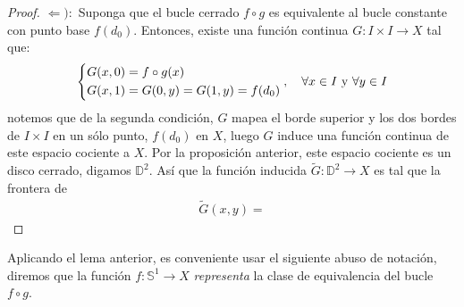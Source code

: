 \documentclass[12pt]{report}
\theoremstyle{largebreak}
\newcommand\cf[3]{\ensuremath{#1:#2\rightarrow#3}}
\begin{document}
\begin{proof}
        $\Leftarrow):$ Suponga que el bucle cerrado $f\circ g$ es equivalente al bucle constante con punto base $f(d_0)$. Entonces, existe una función continua $\cf{G}{I\times I}{X}$ tal que:
        \begin{equation*}
            \left\{
                \begin{split}
                    G(x,0) & = f\circ g(x)\\
                    G(x,1) & = G(0,y) = G(1,y) = f(d_0)\\
                \end{split}
            \right.,\quad\forall x\in I\textup{ y }\forall y\in I
        \end{equation*}
        notemos que de la segunda condición, $G$ mapea el borde superior y los dos bordes de $I\times I$ en un sólo punto, $f(d_0)$ en $X$, luego $G$ induce una función continua de este espacio cociente a $X$. Por la proposición anterior, este espacio cociente es un disco cerrado, digamos $\mathbb{D}^2$. Así que la función inducida $\cf{\widetilde{G}}{\mathbb{D}^2}{X}$ es tal que la frontera de %
        \begin{equation*}
            \begin{split}
                \widetilde{G}(x,y)=
            \end{split}
        \end{equation*}
    \end{proof}

    Aplicando el lema anterior, es conveniente usar el siguiente abuso de notación, diremos que la función $\cf{f}{\mathbb{S}^1}{X}$ \textit{representa} la clase de equivalencia del bucle $f\circ g$.
\end{document}
